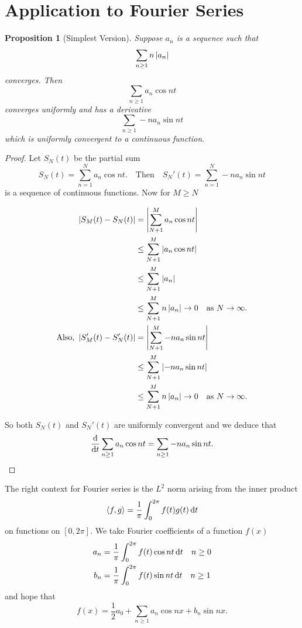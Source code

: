 \documentclass{notes}
\theoremstyle{plain}
\newtheorem{proposition}{Proposition}[chapter]
\begin{document}
\section{Application to Fourier Series}

\begin{proposition}[Simplest Version]
Suppose $ a_{n} $ is a sequence such that \[ \sum_{n \geq 1}n 
\left|a_{n}\right| \] converges.
Then \[ \sum_{n \geq 1}a_{n} \cos n t \] converges uniformly and has 
a derivative \[ \sum_{n \geq 1} - n a_{n} \sin n t \] which is 
uniformly convergent to a continuous function.
\end{proposition}

\begin{proof}
Let $ S_{N}(t) $ be the partial sum
\[ S_{N}(t) = \sum_{n=1}^{N}a_{n}\cos n t. \quad \text{Then} \quad
S_{N}'(t) = \sum_{n=1}^{N}-n 
a_{n} \sin n t \]
is a sequence of continuous functions.  Now for $ M \geq N $

\begin{align*}
\left|S_{M}(t)-S_{N}(t)\right| & = \left| \sum_{N+1}^{M} a_{n} \cos n t\right| \\
& \leq \sum_{N+1}^{M}\left|a_{n} \cos n t\right| \\
& \leq \sum_{N+1}^{M}\left|a_{n}\right| \\
& \leq \sum_{N+1}^{M}n \left|a_{n}\right| \to 0 \quad \text{as } N \to
\infty. \\
\text{Also, }\left|S_{M}'(t) - S_{N}'(t)\right| & = \left|\sum_{N+1}^{M}-n a_{n} \sin n
  t\right|\\
&\leq \sum_{N+1}^{M}\left|-n a_{n} \sin n t\right| \\
 & \leq  \sum_{N+1}^{M}n \left|a_{n}\right| \to 0 \quad \text{as } N \to \infty.
\end{align*}

So both $ S_{N}(t) $ and $ S_{N}'(t) $ are uniformly convergent 
and we deduce that
\[
\frac{\mathrm{d}}{\mathrm{d} t} \sum_{n \geq 1} a_{n} \cos n t = \sum_{n \geq 1}-n 
a_{n} \sin n t.
 \]
\end{proof}

The right context for Fourier series is the $ L^{2} $ norm
arising from the inner product
\[ \langle f,g\rangle =
\frac{1}{\pi} \int_{0}^{2 \pi}f(t)g(t)\,\mathrm{d} t
\]
on functions on $ [0, 2 \pi] $.
We take Fourier coefficients of a function $ f(x) $
\begin{align*}
a_{n} & = \frac{1}{\pi} \int_0^{2 \pi} f(t) \cos n t\, \mathrm{d} t \quad n \geq 0 \\
b_{n} & = \frac{1}{\pi}\int_0^{2 \pi} f(t) \sin n t\, \mathrm{d} t \quad n \geq 1
\end{align*}
and hope that
\[
f(x) = \frac{1}{2} a_{0} + \sum_{n \geq 1}a_{n} \cos n x + b_{n} 
\sin n x.
\]
\end{document}
